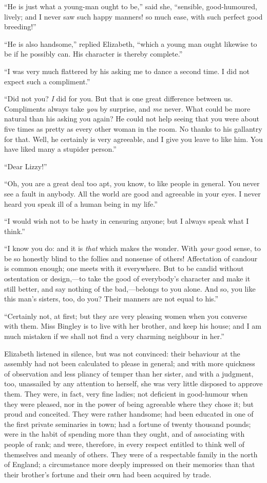 \documentclass[12pt,openright]{book}
\begin{document}
“He is just what a young-man ought to be,” said she, “sensible, good-humoured, lively; and I never saw such happy manners! so much ease, with such perfect good breeding!”

“He is also handsome,” replied Elizabeth, “which a young man ought likewise to be if he possibly can. His character is thereby complete.”

“I was very much flattered by his asking me to dance a second time. I did not expect such a compliment.”

“Did not you? \textit{I} did for you. But that is one great difference between us. Compliments always take \textit{you} by surprise, and \textit{me} never. What could be more natural than his asking you again? He could not help seeing that you were about five times as pretty as every other woman in the room. No thanks to his gallantry for that. Well, he certainly is very agreeable, and I give you leave to like him. You have liked many a stupider person.”

“Dear Lizzy!”

“Oh, you are a great deal too apt, you know, to like people in general. You never see a fault in anybody. All the world are good and agreeable in your eyes. I never heard you speak ill of a human being in my life.”

“I would wish not to be hasty in censuring anyone; but I always speak what I think.”

“I know you do: and it is \textit{that} which makes the wonder. With \textit{your} good sense, to be so honestly blind to the follies and nonsense of others! Affectation of candour is common enough; one meets with it everywhere. But to be candid without ostentation or design,—to take the good of everybody’s character and make it still better, and say nothing of the bad,—belongs to you alone. And so, you like this man’s sisters, too, do you? Their manners are not equal to his.”

“Certainly not, at first; but they are very pleasing women when you converse with them. Miss Bingley is to live with her brother, and keep his house; and I am much mistaken if we shall not find a very charming neighbour in her.”

Elizabeth listened in silence, but was not convinced: their behaviour at the assembly had not been calculated to please in general; and with more quickness of observation and less pliancy of temper than her sister, and with a judgment, too, unassailed by any attention to herself, she was very little disposed to approve them. They were, in fact, very fine ladies; not deficient in good-humour when they were pleased, nor in the power of being agreeable where they chose it; but proud and conceited. They were rather handsome; had been educated in one of the first private seminaries in town; had a fortune of twenty thousand pounds; were in the habit of spending more than they ought, and of associating with people of rank; and were, therefore, in every respect entitled to think well of themselves and meanly of others. They were of a respectable family in the north of England; a circumstance more deeply impressed on their memories than that their brother’s fortune and their own had been acquired by trade.
\end{document}
